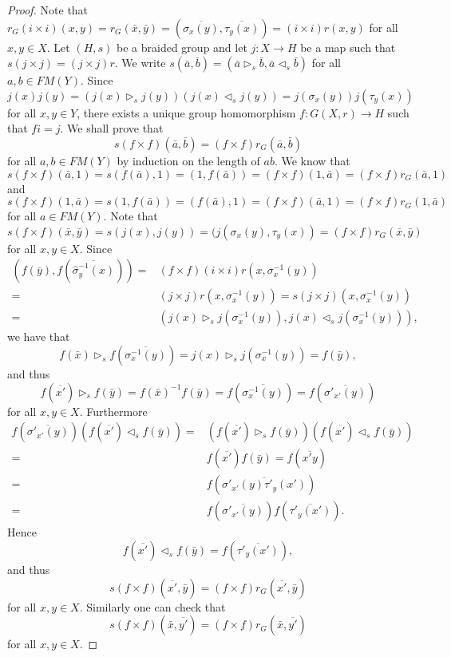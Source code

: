 \begin{proof}
Note that $r_G(i\times i)(x,y)=r_G(\bar x,\bar y)=(\overline{\sigma_x(y)},\overline{\tau_y(x)})=(i\times i)r(x,y)$ for all $x,y\in X$. Let $(H,s)$ be a braided group and let $j\colon X\rightarrow H$ be a map such that $s(j\times j)=(j\times j)r$.
We write $s(\bar a,\bar b)=(\bar a\rhd_s \bar b, \bar a\lhd_s \bar b)$ for all $a,b\in FM(Y)$. Since 
\[ j(x)j(y)=(j(x)\rhd_s j(y))(j(x)\lhd_s j(y))=j(\sigma_x(y))j(\tau_y(x))\]
for all $x,y\in Y$, there exists a unique group homomorphism $f\colon G(X,r)\rightarrow H$ such that $fi=j$. We shall prove that
\[ s(f\times f)(\bar a,\bar b)=(f\times f)r_G(\bar a, \bar b)\]
for all $a,b\in FM(Y)$ by induction on the length of $ab$.
We know that
\[ s(f\times f)(\bar a,1)=s(f(\bar a),1)=(1,f(\bar a))=(f\times f)(1,\bar a)=(f\times f)r_G(\bar a ,1)\]
and
\[ s(f\times f)(1,\bar a)=s(1,f(\bar a))=(f(\bar a),1)=(f\times f)(\bar a,1)=(f\times f)r_G(1,\bar a)\]
for all $a\in FM(Y)$. Note that
\[s(f\times f)(\bar x,\bar y)=s(j(x),j(y))=(j(\sigma_x(y),\tau_y(x))=(f\times f)r_G(\bar x,\bar y)\]
for all $x,y\in X$.
Since 
\begin{align*}
\left(f(\bar y),f\left(\overline{\widehat{\sigma}^{-1}_y(x)}\right)\right)=&(f\times f)(i\times i)r( x,\sigma^{-1}_x(y))\\
=&(j\times j)r( x,\sigma^{-1}_x(y))=s(j\times j)( x,\sigma^{-1}_x(y))\\
=&(j(x)\rhd_s j(\sigma^{-1}_x(y)),j(x)\lhd_s j(\sigma^{-1}_x(y))),
\end{align*}
we have that
\[ f(\bar x)\rhd_s f\left(\overline{\sigma^{-1}_x(y)}\right)=j(x)\rhd_s j(\sigma^{-1}_x(y))=f(\bar y),\]
and thus 
\[f\left(\overline{x'}\right)\rhd_s f(\bar y)=f(\bar x)^{-1}f(\bar y)=f\left(\overline{\sigma^{-1}_x(y)}\right)=f\left(\overline{\sigma'_{x'}(y)}\right)\]
for all $x,y\in X$. Furthermore
\begin{align*}
    f\left(\overline{\sigma'_{x'}(y)}\right)\left(f\left(\overline{x'}\right)\lhd_s f(\bar y)\right)=&
    \left( f\left(\overline{x'}\right)\rhd_s f(\bar y)\right)\left(f\left(\overline{x'}\right)\lhd_s f(\bar y)\right)\\
    =&f\left(\overline{x'}\right)f(\bar y)=f\left(\overline{x'y}\right)\\
    =&f\left(\overline{\sigma'_{x'}(y)\tau'_y(x')}\right)\\
    =&f\left(\overline{\sigma'_{x'}(y)}\right)f\left(\overline{\tau'_y(x')}\right).
\end{align*}
Hence
\[f\left(\overline{x'}\right)\lhd_s f(\bar y)=f\left(\overline{\tau'_y(x')}\right),\]
and thus
\[s(f\times f)\left(\overline{x'},\bar y\right)=(f\times f)r_G\left(\overline{x'},\bar y\right)\]
for all $x,y\in X$. Similarly one can check that
\[s(f\times f)\left(\bar x,\overline{y'}\right)=(f\times f)r_G\left(\bar x,\overline{y'}\right)\]
for all $x,y\in X$. 



\end{proof}
